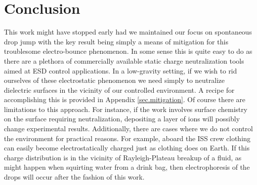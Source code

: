 \documentclass[12pt,a4paper,oneside]{book}
\begin{document}
\section{Conclusion}
This work might have stopped early had we maintained our focus on spontaneous drop jump with the key result being simply a means of mitigation for this troublesome electro-bounce phenomenon. In some sense this is quite easy to do as there are a plethora of commercially available static charge neutralization tools aimed at ESD control applications. In a low-gravity setting, if we wish to rid ourselves of these electrostatic phenomenon we need simply to neutralize dielectric surfaces in the vicinity of our controlled environment. A recipe for accomplishing this is provided in Appendix \ref{sec.mitigation}. Of course there are limitations to this approach. For instance, if the work involves surface chemistry on the surface requiring neutralization, depositing a layer of ions will possibly change experimental results. Additionally, there are cases where we do not control the environment for practical reasons. For example, aboard the ISS crew clothing can easily become electrostatically charged just as clothing does on Earth. If this  charge distribution is in the vicinity of Rayleigh-Plateau breakup of a fluid, as might happen when squirting water from a drink bag, then electrophoresis of the drops will occur after the fashion of this work.
\end{document}
